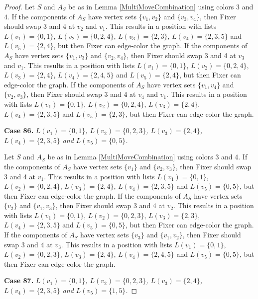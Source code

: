 \documentclass[12pt]{amsart}
\theoremstyle{plain}
\theoremstyle{definition}
\theoremstyle{remark}
\begin{document}
\begin{proof}
Let $S$ and $A_S$ be as in Lemma \ref{MultiMoveCombination} using colors $3$ and $4$. If the components of $A_S$ have vertex sets $\{v_1, v_2\}$ and $\{v_3, v_4\}$, then Fixer should swap 3 and 4 at $v_2$ and $v_1$. This results in a position with lists $L(v_1) = \{0, 1\}$, $L(v_2) = \{0, 2, 4\}$, $L(v_3) = \{2, 3\}$, $L(v_4) = \{2, 3, 5\}$ and $L(v_5) = \{2, 4\}$, but then Fixer can edge-color the graph.
If the components of $A_S$ have vertex sets $\{v_1, v_3\}$ and $\{v_2, v_4\}$, then Fixer should swap 3 and 4 at $v_3$ and $v_1$. This results in a position with lists $L(v_1) = \{0, 1\}$, $L(v_2) = \{0, 2, 4\}$, $L(v_3) = \{2, 4\}$, $L(v_4) = \{2, 4, 5\}$ and $L(v_5) = \{2, 4\}$, but then Fixer can edge-color the graph.
If the components of $A_S$ have vertex sets $\{v_1, v_4\}$ and $\{v_2, v_3\}$, then Fixer should swap 3 and 4 at $v_4$ and $v_1$. This results in a position with lists $L(v_1) = \{0, 1\}$, $L(v_2) = \{0, 2, 4\}$, $L(v_3) = \{2, 4\}$, $L(v_4) = \{2, 3, 5\}$ and $L(v_5) = \{2, 3\}$, but then Fixer can edge-color the graph.

\noindent\textbf{Case 86.  }\textit{$L(v_1) = \{0, 1\}$, $L(v_2) = \{0, 2, 3\}$, $L(v_3) = \{2, 4\}$, $L(v_4) = \{2, 3, 5\}$ and $L(v_5) = \{0, 5\}$.}

Let $S$ and $A_S$ be as in Lemma \ref{MultiMoveCombination} using colors $3$ and $4$. If the components of $A_S$ have vertex sets $\{v_1\}$ and $\{v_2, v_3\}$, then Fixer should swap 3 and 4 at $v_1$. This results in a position with lists $L(v_1) = \{0, 1\}$, $L(v_2) = \{0, 2, 4\}$, $L(v_3) = \{2, 4\}$, $L(v_4) = \{2, 3, 5\}$ and $L(v_5) = \{0, 5\}$, but then Fixer can edge-color the graph.
If the components of $A_S$ have vertex sets $\{v_2\}$ and $\{v_1, v_3\}$, then Fixer should swap 3 and 4 at $v_2$. This results in a position with lists $L(v_1) = \{0, 1\}$, $L(v_2) = \{0, 2, 3\}$, $L(v_3) = \{2, 3\}$, $L(v_4) = \{2, 3, 5\}$ and $L(v_5) = \{0, 5\}$, but then Fixer can edge-color the graph.
If the components of $A_S$ have vertex sets $\{v_3\}$ and $\{v_1, v_2\}$, then Fixer should swap 3 and 4 at $v_3$. This results in a position with lists $L(v_1) = \{0, 1\}$, $L(v_2) = \{0, 2, 3\}$, $L(v_3) = \{2, 4\}$, $L(v_4) = \{2, 4, 5\}$ and $L(v_5) = \{0, 5\}$, but then Fixer can edge-color the graph.

\noindent\textbf{Case 87.  }\textit{$L(v_1) = \{0, 1\}$, $L(v_2) = \{0, 2, 3\}$, $L(v_3) = \{2, 4\}$, $L(v_4) = \{2, 3, 5\}$ and $L(v_5) = \{1, 5\}$.}


\end{proof}
\end{document}
